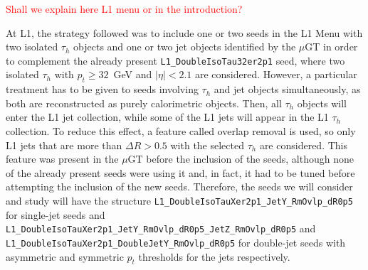 \documentclass[../main.tex]{subfiles}
\begin{document}
\textcolor{red}{Shall we explain here L1 menu or in the introduction?}

At L1, the strategy followed was to include one or two seeds in the L1 Menu with two isolated $\tau_h$ objects and one or two jet objects identified by the $\mu$GT in order to complement the already present \texttt{L1\_DoubleIsoTau32er2p1} seed, where two isolated $\tau_h$ with $p_t\geq32$~GeV and $|\eta|<2.1$ are considered. However, a particular treatment has to be given to seeds involving $\tau_h$ and jet objects simultaneously, as both are reconstructed as purely calorimetric objects. Then, all $\tau_h$ objects will enter the L1 jet collection, while some of the L1 jets will appear in the L1 $\tau_h$ collection. To reduce this effect, a feature called overlap removal \cite{intro:l1_13tev} is used,  so only L1 jets that are more than $\Delta R>0.5$ with the selected $\tau_h$ are considered. This feature was present in the $\mu$GT before the inclusion of the seeds, although none of the already present seeds were using it and, in fact, it had to be tuned before attempting the inclusion of the new seeds. Therefore, the seeds we will consider and study will have the structure \texttt{L1\_DoubleIsoTauXer2p1\_JetY\_RmOvlp\_dR0p5} for single-jet seeds and \texttt{L1\_DoubleIsoTauXer2p1\_JetY\_RmOvlp\_dR0p5\_JetZ\_RmOvlp\_dR0p5} and \texttt{L1\_DoubleIsoTauXer2p1\_DoubleJetY\_RmOvlp\_dR0p5} for double-jet seeds with asymmetric and symmetric $p_t$ thresholds for the jets respectively.
\end{document}
